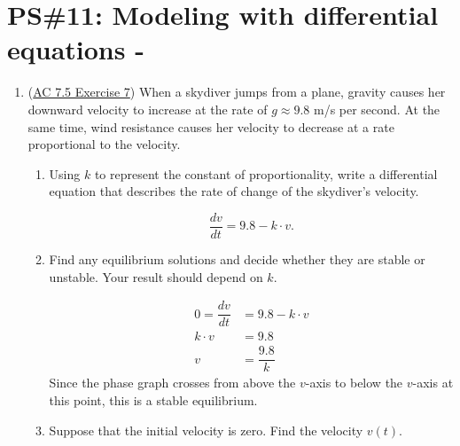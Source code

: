 


%


\allowdisplaybreaks
\section{PS\#11: Modeling with differential equations -  }


\begin{enumerate}[leftmargin=0pt]

\item (\href{https://activecalculus.org/single/sec-7-5-modeling.html#ez-7-5-7}{AC 7.5 Exercise 7}) When a skydiver jumps from a plane, gravity causes her downward velocity to increase at the rate of $g\approx 9.8$ m/s per second. At the same time, wind resistance causes her velocity to decrease at a rate proportional to the velocity.
\begin{enumerate}
    \item Using $k$ to represent the constant of proportionality, write a differential equation that describes the rate of change of the skydiver's velocity.
    \begin{red}
        \[\dfrac{dv}{dt} = 9.8 - k\cdot v.\]
    \end{red}
    \item Find any equilibrium solutions and decide whether they are stable or unstable. Your result should depend on $k$.
    \begin{red}
        \begin{align*}
            0 = \dfrac{dv}{dt} &= 9.8 - k\cdot v \\
            k\cdot v &= 9.8 \\
            v &= \dfrac{9.8}{k} 
        \end{align*}
        Since the phase graph crosses from above the $v$-axis to below the $v$-axis at this point, this is a stable equilibrium.
    \end{red}
    \item Suppose that the initial velocity is zero. Find the velocity $v(t)$.


\end{enumerate}
\end{enumerate}
